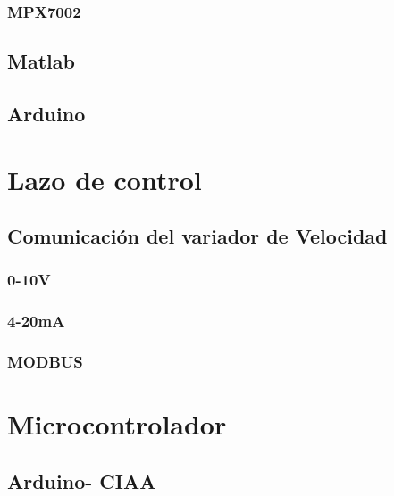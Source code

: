 \documentclass[12pt,a4paper]{article}
\begin{document}
	\subsubsection{MPX7002}
	
	\subsection{Matlab}
	\subsection{Arduino}
	\section{Lazo de control}
	\subsection{Comunicación del variador de Velocidad}
	\subsubsection{0-10V}
	\subsubsection{4-20mA}
	\subsubsection{MODBUS}
	\section{Microcontrolador}
	\subsection{Arduino- CIAA}

\newpage

\end{document}

